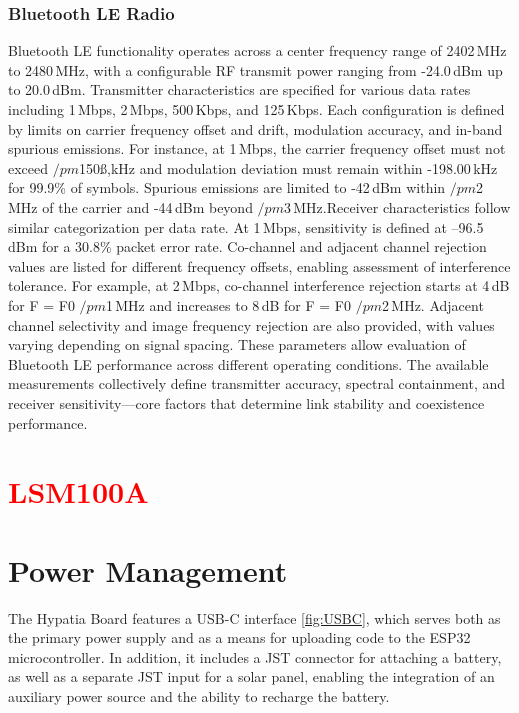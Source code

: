 \subsubsection{Bluetooth LE Radio}
Bluetooth LE functionality operates across a center frequency range of 2402\,MHz to 2480\,MHz, with a configurable RF transmit power ranging from -24.0\,dBm up to 20.0\,dBm. Transmitter characteristics are specified for various data rates including 1\,Mbps, 2\,Mbps, 500\,Kbps, and 125\,Kbps. Each configuration is defined by limits on carrier frequency offset and drift, modulation accuracy, and in-band spurious emissions. For instance, at 1\,Mbps, the carrier frequency offset must not exceed $/pm$150ß,kHz and modulation deviation must remain within -198.00\,kHz for 99.9\% of symbols. Spurious emissions are limited to -42\,dBm within $/pm$2\,MHz of the carrier and -44\,dBm beyond $/pm$3\,MHz.Receiver characteristics follow similar categorization per data rate. At 1\,Mbps, sensitivity is defined at –96.5\,dBm for a 30.8\% packet error rate. Co-channel and adjacent channel rejection values are listed for different frequency offsets, enabling assessment of interference tolerance. For example, at 2\,Mbps, co-channel interference rejection starts at 4\,dB for F = F0 $/pm$1\,MHz and increases to 8\,dB for F = F0 $/pm$2\,MHz. Adjacent channel selectivity and image frequency rejection are also provided, with values varying depending on signal spacing. These parameters allow evaluation of Bluetooth LE performance across different operating conditions. The available measurements collectively define transmitter accuracy, spectral containment, and receiver sensitivity—core factors that determine link stability and coexistence performance.

\section{\textcolor{red}{LSM100A}}%

\section{Power Management}
The Hypatia Board features a USB-C interface \ref{fig:USBC}, which serves both as the primary power supply and as a means for uploading code to the ESP32 microcontroller. In addition, it includes a JST connector for attaching a battery, as well as a separate JST input for a solar panel, enabling the integration of an auxiliary power source and the ability to recharge the battery.

